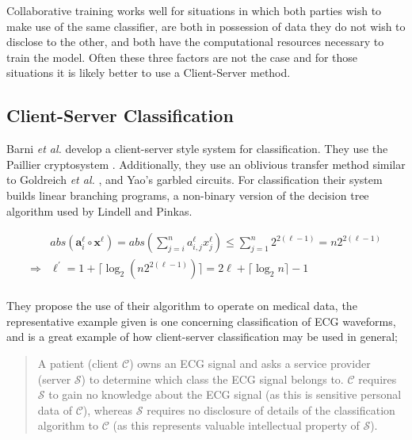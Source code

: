 \documentclass[]{article}
\begin{document}
Collaborative training works well for situations in which both parties wish to make use of the same classifier, are both in possession of data they do not wish to disclose to the other, and both have the computational resources necessary to train the model. 
Often these three factors are not the case and for those situations it is likely better to use a Client-Server method.

	\subsection{Client-Server Classification}	

Barni \emph{et al.} \cite{Barni2009} develop a client-server style system for classification.
They use the Paillier cryptosystem \cite{Paillier1999}.
Additionally, they use an oblivious transfer method similar to Goldreich \emph{et al.} \cite{Goldreich1987},
and Yao's garbled circuits. \cite{Yao1982}
For classification their system builds linear branching programs, 
a non-binary version of the decision tree algorithm used by Lindell and Pinkas. \cite{Lindell2000}

\begingroup
\setlength{\FrameSep}{-0.5em}
\begin{framed}	
	\begin{align*}
	& abs(\textbf{a}^\ell_i \circ \textbf{x}^\ell) =
	  abs(\sum_{j=i}^{n} a^\ell_{i,j}x^\ell_j) \leq
	  \sum_{j=1}^{n}2^{2(\ell-1)} = n2^{2(\ell-1)} \\
	\Rightarrow
	& \ell^\prime = 1 + \lceil\log_2(n2^{2(\ell-1)})\rceil
	  = 2\ell + \lceil\log_2n\rceil -1 \\
	\end{align*}
	\vspace{-2em}
\end{framed}
\vspace{-1.25em}
\vspace{1.5em}
\endgroup

They propose the use of their algorithm to operate on medical data, 
the representative example given is one concerning classification of ECG waveforms,
and is a great example of how client-server classification may be used in general;

\begin{quote}
	A patient (client $\mathcal{C}$) owns an ECG signal and asks a service provider (server $\mathcal{S}$) to determine which class the ECG signal belongs to. $\mathcal{C}$ requires $\mathcal{S}$ to gain no knowledge about the ECG signal (as this is sensitive personal data of $\mathcal{C}$), whereas $\mathcal{S}$ requires no disclosure of details of the classification algorithm to $\mathcal{C}$ (as this represents valuable intellectual property of $\mathcal{S}$).
	\cite[p. 13]{Barni2009}
\end{quote} 
\end{document}
